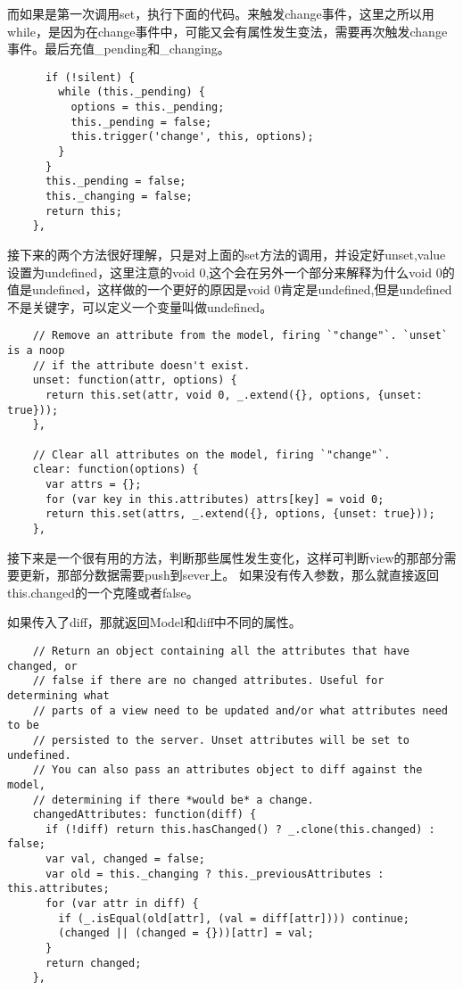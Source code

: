 \documentclass[12pt, oneside, b5paper]{book}
\begin{document}
\begin{CJK}{UTF8}{gkai}
  而如果是第一次调用set，执行下面的代码。来触发change事件，这里之所以用while，是因为在change事件中，可能又会有属性发生变法，需要再次触发change事件。最后充值\_pending和\_changing。
  \begin{lstlisting}
      if (!silent) {
        while (this._pending) {
          options = this._pending;
          this._pending = false;
          this.trigger('change', this, options);
        }
      }
      this._pending = false;
      this._changing = false;
      return this;
    },

  \end{lstlisting}

  接下来的两个方法很好理解，只是对上面的set方法的调用，并设定好unset,value设置为undefined，这里注意的void 0,这个会在另外一个部分来解释为什么void 0的值是undefined，这样做的一个更好的原因是void 0肯定是undefined,但是undefined不是关键字，可以定义一个变量叫做undefined。

  \begin{lstlisting}
    // Remove an attribute from the model, firing `"change"`. `unset` is a noop
    // if the attribute doesn't exist.
    unset: function(attr, options) {
      return this.set(attr, void 0, _.extend({}, options, {unset: true}));
    },

    // Clear all attributes on the model, firing `"change"`.
    clear: function(options) {
      var attrs = {};
      for (var key in this.attributes) attrs[key] = void 0;
      return this.set(attrs, _.extend({}, options, {unset: true}));
    },

  \end{lstlisting}

  接下来是一个很有用的方法，判断那些属性发生变化，这样可判断view的那部分需要更新，那部分数据需要push到sever上。
  如果没有传入参数，那么就直接返回this.changed的一个克隆或者false。

  如果传入了diff，那就返回Model和diff中不同的属性。
  \begin{lstlisting}
    // Return an object containing all the attributes that have changed, or
    // false if there are no changed attributes. Useful for determining what
    // parts of a view need to be updated and/or what attributes need to be
    // persisted to the server. Unset attributes will be set to undefined.
    // You can also pass an attributes object to diff against the model,
    // determining if there *would be* a change.
    changedAttributes: function(diff) {
      if (!diff) return this.hasChanged() ? _.clone(this.changed) : false;
      var val, changed = false;
      var old = this._changing ? this._previousAttributes : this.attributes;
      for (var attr in diff) {
        if (_.isEqual(old[attr], (val = diff[attr]))) continue;
        (changed || (changed = {}))[attr] = val;
      }
      return changed;
    },
  \end{lstlisting}


\end{CJK}
\end{document}
